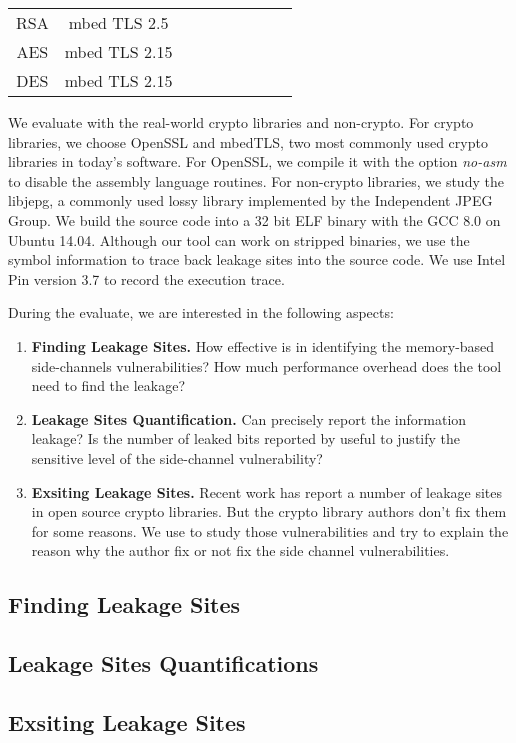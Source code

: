 \begin{table*}[t]
\begin{tabular}{c c c c c c c c l}
    RSA                       & mbed TLS 2.5                       &                        &                       &                       &                       &                       &                        &                  \\
    AES                       & mbed TLS 2.15                      &                        &                       &                       &                       &                       &                        &                  \\
    DES                       & mbed TLS 2.15                      &                        &                       &                       &                       &                       &                        &                  \\
    \hline
    \end{tabular}
\end{table*}
We evaluate \tool{} with the real-world crypto libraries and non-crypto. 
For crypto libraries, we choose OpenSSL and mbedTLS, two most commonly used
crypto libraries in today's software. For OpenSSL, we compile it with the option \textit{no-asm} 
to disable the assembly language routines. For non-crypto libraries, 
we study the libjepg, a commonly used lossy library implemented by 
the Independent JPEG Group. We build the source code into a 32 bit 
ELF binary with the GCC 8.0 on Ubuntu 14.04. Although our tool can
work on stripped binaries, we use the symbol information to trace
back leakage sites into the source code. We use Intel Pin version 3.7 
to record the execution trace.


During the evaluate, we are interested in the following aspects:
\begin{enumerate}
    \item \textbf{Finding Leakage Sites.} How effective is \tool{} in 
    identifying the memory-based side-channels vulnerabilities?
    How much performance overhead does the tool need to find the 
    leakage?
    \item \textbf{Leakage Sites Quantification.} Can \tool{} precisely
    report the information leakage? Is the number of leaked bits reported 
    by \tool{} useful to justify the sensitive level of the side-channel
    vulnerability?
    \item \textbf{Exsiting Leakage Sites.} Recent work has report a number
    of leakage sites in open source crypto libraries. But the crypto
    library authors don't fix them for some reasons. We use \tool{} to
    study those vulnerabilities and try to explain the reason why the 
    author fix or not fix the side channel vulnerabilities.
\end{enumerate}


\subsection{Finding Leakage Sites}
\subsection{Leakage Sites Quantifications}
\subsection{Exsiting Leakage Sites}
